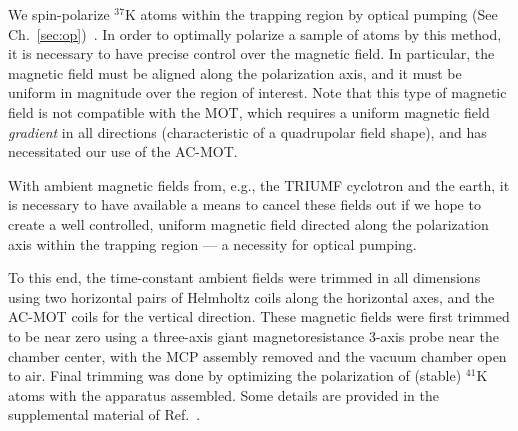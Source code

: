 We spin-polarize $^{37}\textrm{K}$ atoms within the trapping region by optical pumping (See Ch.~\ref{sec:op})~\cite{ben_OP}.  In order to optimally polarize a sample of atoms by this method, it is necessary to have precise control over the magnetic field.  
In particular, the magnetic field must be aligned along the polarization axis, 
and it must be uniform in magnitude over the region of interest.  
Note that this type of magnetic field is not compatible with the MOT, which requires a uniform magnetic field \emph{gradient} in all directions (characteristic of a quadrupolar field shape), and has necessitated our use of the AC-MOT.




\FloatBarrier
\label{sec:trimming}
With ambient magnetic fields from, e.g., the TRIUMF cyclotron and the earth, it is necessary to have available a means to cancel these fields out if we hope to create a well controlled, uniform magnetic field directed along the polarization axis within the trapping region --- a necessity for optical pumping.  

To this end, the time-constant ambient fields were trimmed in all dimensions using two horizontal pairs of Helmholtz coils along the horizontal axes, and the AC-MOT coils for the vertical direction.
These magnetic fields were first trimmed to be near zero using a three-axis giant magnetoresistance 3-axis probe near the chamber center, with the \ac{MCP} assembly removed and the vacuum chamber open to air.
%
Final trimming was done by optimizing the polarization of (stable) $^{41}$K atoms with the apparatus assembled.  Some details are provided in the supplemental material of Ref.~\cite{ben_Abeta}. 


